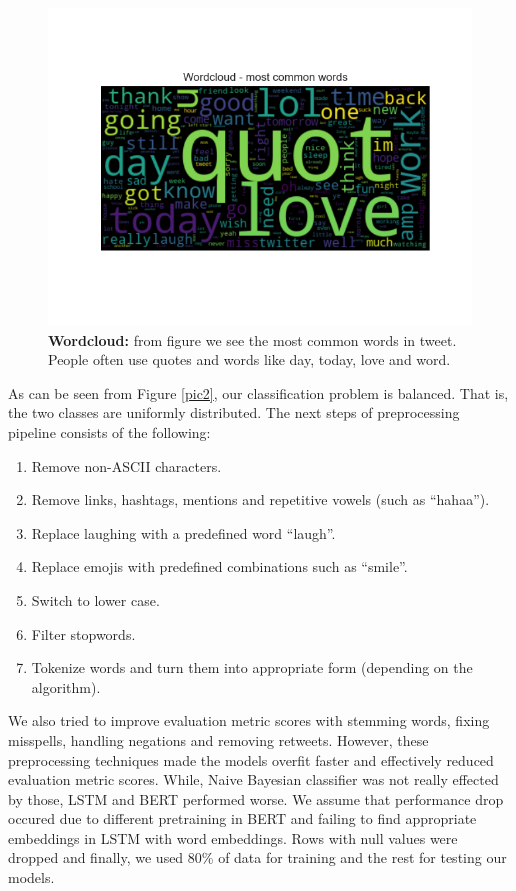 \documentclass[conference]{IEEEtran}
\begin{document}
\begin{figure}[hbt!]\centering
\centering
\includegraphics[width=\linewidth]{wordcloud}
\caption{\textbf{Wordcloud:} from figure we see the most common words in tweet. People often use quotes and words like day, today, love and word.}
\label{pic1}
\end{figure}

As can be seen from Figure \ref{pic2}, our classification problem is balanced. That is, the two classes are uniformly distributed. The next steps of preprocessing pipeline consists of the following:
\begin{enumerate}
	\item Remove non-ASCII characters.
	\item Remove links, hashtags, mentions and repetitive vowels (such as ``hahaa'').
	\item Replace laughing with a predefined word ``laugh''.
	\item Replace emojis with predefined combinations such as ``smile''.
	\item Switch to lower case.
	\item Filter stopwords.
	\item Tokenize words and turn them into appropriate form (depending on the algorithm).
\end{enumerate}

We also tried to improve evaluation metric scores with stemming words, fixing misspells, handling negations and removing retweets. However, these preprocessing techniques made the models overfit faster and effectively reduced evaluation metric scores. While, Naive Bayesian classifier was not really effected by those, LSTM and BERT performed worse. We assume that performance drop occured due to different pretraining in BERT and failing to find appropriate embeddings in LSTM with word embeddings. Rows with null values were dropped and finally, we used 80\% of data for training and the rest for testing our models.
\end{document}
